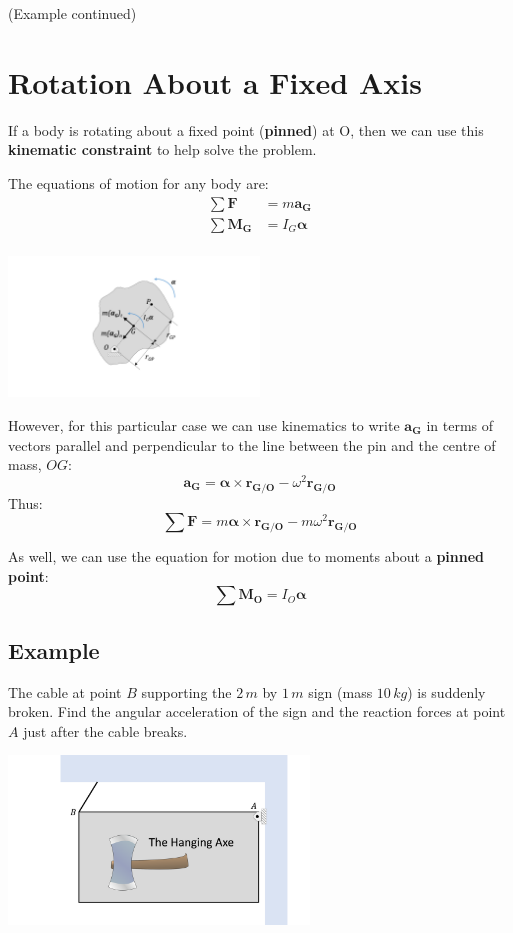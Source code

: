 \documentclass[12pt,letterpaper,twoside]{report}
\begin{document}
\newpage
(Example continued)
\newpage

\section{Rotation About a Fixed Axis}
If a body is rotating about a fixed point (\textbf{pinned}) at O, then we can use this \textbf{kinematic constraint} to help solve the problem.  

The equations of motion for any body are:
\begin{align*}
\sum \bm{F} &= m \bm{a_G}\\
\sum \bm{M_G} &= I_G \bm{\alpha}\\
\end{align*}

\includegraphics[trim={8cm 2cm 5cm 2cm},clip,width=0.5\textwidth, center]{Slide54} 

However, for this particular case we can use kinematics to write $\bm{a_G}$ in terms of vectors parallel and perpendicular to the line between the pin and the centre of mass, $OG$: 
\[
\bm{a_G} = \bm{\alpha} \times \bm{r_{G/O}} - \omega^2 \bm{r_{G/O}}
\]
Thus:
\[
\sum \bm{F} = m \bm{\alpha} \times \bm{r_{G/O}} - m \omega^2 \bm{r_{G/O}}
\]

As well, we can use the equation for motion due to moments about a \textbf{pinned point}:
\[
\sum \bm{M_O}  = I_O \bm{\alpha}
\]

\newpage

\subsection{Example}
The cable at point $B$ supporting the $2 \, m$ by $1 \, m$ sign (mass $10 \, kg$) is suddenly broken.  Find the angular acceleration of the sign and the reaction forces at point $A$ just after the cable breaks.  

\includegraphics[trim={4cm 1cm 1cm 1cm},clip,width=0.6\textwidth, left]{Slide55} 
\end{document}
